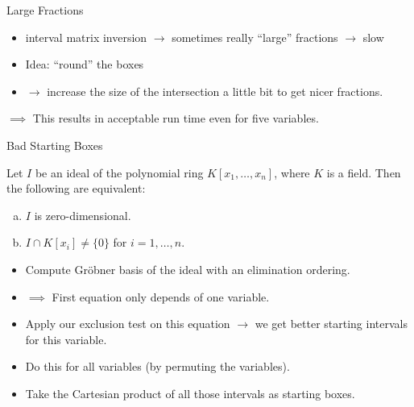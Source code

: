 \documentclass[german,10pt,xcolor=colortbl,compress]{beamer}
\begin{document}
\begin{frame}{Large Fractions}
    \begin{itemize}
        \item interval matrix inversion $\rightarrow$ sometimes really \enquote{large}
            fractions $\rightarrow$ slow
        \item Idea: \enquote{round} the boxes
        \item[]$\rightarrow$ increase the size of the intersection a little bit to get
            nicer fractions.
    \end{itemize}
    \bigskip
    \pause

    \begin{center}
    \end{center}
    \pause

    $\implies$ This results in acceptable run time even for five variables.
\end{frame}

\begin{frame}{Bad Starting Boxes}
    \begin{lemma}
        Let $I$ be an ideal of the polynomial ring $K[x_1, \hdots, x_n]$, where $K$ is a
        field. Then the following are equivalent:
        \begin{enumerate}[a)]
            \item $I$ is zero-dimensional.
            \item $I \cap K[x_i] \neq \{0\}$ for $i=1,\hdots, n$.
        \end{enumerate}
    \end{lemma}
    \pause

    \begin{itemize}
        \item Compute Gröbner basis of the ideal with an elimination ordering.
        \item[] $\implies$ First equation only depends of one variable.
        \pause
        \item Apply our exclusion test on this equation $\rightarrow$ we get better
            starting intervals for this variable.
        \item Do this for all variables (by permuting the variables).
        \item Take the Cartesian product of all those intervals as starting boxes.
    \end{itemize}
\end{frame}
\end{document}
